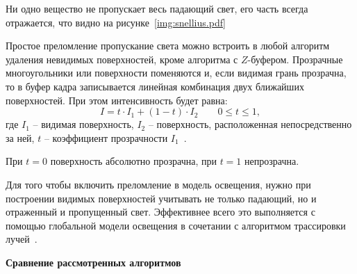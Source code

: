 Ни одно вещество не пропускает весь падающий свет, его часть всегда отражается, что видно на рисунке~\ref{img:snellius.pdf}

Простое преломление пропускание света можно встроить в любой алгоритм удаления невидимых поверхностей, кроме алгоритма с $Z$-буфером.
Прозрачные многоугольники или поверхности поменяются и, если видимая грань прозрачна, то в буфер кадра записывается линейная комбинация двух ближайших поверхностей. При этом интенсивность будет равна:
\begin{equation}
	I = t\cdot I_1 + (1 - t)\cdot I_2 \qquad 0 \leq t \leq 1,
\end{equation}
где $I_1$ -- видимая поверхность, $I_2$ -- поверхность, расположенная непосредственно за ней, $t$ -- коэффициент прозрачности $I_1$~\cite{rodgers}. 

При $t = 0$  поверхность абсолютно прозрачна, при $t = 1$ непрозрачна.

Для того чтобы включить преломление в модель освещения, нужно при построении видимых поверхностей учитывать не только падающий, но и отраженный и пропущенный свет. Эффективнее всего это выполняется с помощью глобальной модели освещения в сочетании с алгоритмом трассировки лучей~\cite{rodgers}.

\textbf{Сравнение рассмотренных алгоритмов}

